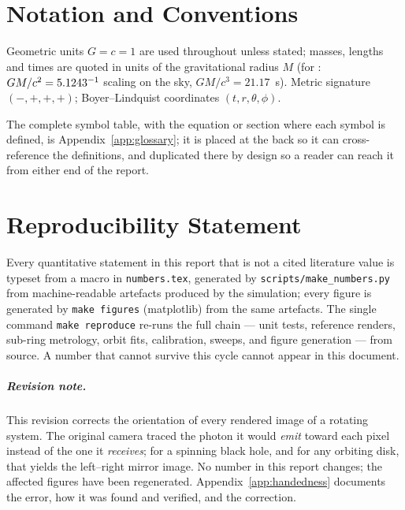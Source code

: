 \chapter*{Notation and Conventions}

Geometric units $G=c=1$ are used throughout unless stated; masses, lengths
and times are quoted in units of the gravitational radius $M$
(for \sgra{}: $GM/c^2 = 5.1243^{-1}$ scaling on the sky, $GM/c^3 = 21.17$~s).
Metric signature $(-,+,+,+)$; Boyer--Lindquist coordinates
$(t,r,\theta,\phi)$.

The complete symbol table, with the equation or section where each
symbol is defined, is Appendix~\ref{app:glossary}; it is placed at the
back so it can cross-reference the definitions, and duplicated there
by design so a reader can reach it from either end of the report.

\chapter*{Reproducibility Statement}

Every quantitative statement in this report that is not a cited literature
value is typeset from a macro in \texttt{numbers.tex}, generated by
\texttt{scripts/make\_numbers.py} from machine-readable artefacts produced by
the simulation; every figure is generated by \texttt{make figures}
(matplotlib) from the same artefacts. The single command
\texttt{make reproduce} re-runs the full chain — unit tests, reference
renders, sub-ring metrology, orbit fits, calibration, sweeps, and figure
generation — from source. A number that cannot survive this cycle cannot
appear in this document.

\paragraph{Revision note.} This revision corrects the orientation of
every rendered image of a rotating system. The original camera traced
the photon it would \emph{emit} toward each pixel instead of the one it
\emph{receives}; for a spinning black hole, and for any orbiting disk,
that yields the left--right mirror image. No number in this report
changes; the affected figures have been regenerated.
Appendix~\ref{app:handedness} documents the error, how it was found and
verified, and the correction.

\cleardoublepage
{}
